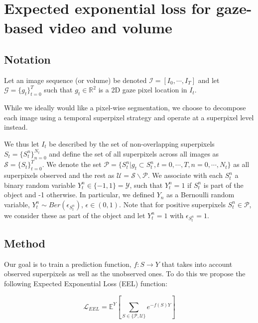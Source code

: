 
\chapter{Expected exponential loss for gaze-based video and volume}
\label{eel} %

\section{Notation}
Let an image sequence (or volume) be denoted $\mathcal{I} = [I_{0}, \cdots , I_{T}]$ and let $\mathcal{G} = \{g_{t} \}^{T}_{t=0}$ such that $g_t\in \mathbb{R}^{2}$ is a 2D gaze pixel location in $I_{t}$.

While we ideally would like
a pixel-wise segmentation, we choose to decompose each image using a temporal superpixel
strategy \cite{chang13} and operate at a superpixel level instead.

We thus let $I_t$ be described by the set of non-overlapping superpixels
$S_{t} = \{S^{n}_t\}^{N_t}_{n=0}$ and define the set of all superpixels across all
images as $\mathcal{S} = \{S_t \}^{T}_{t=0}$.
We denote the set $\mathcal{P} = \{S^{n}_t | g_{t} \subset S^{n}_t, t = 0, \cdots, T, n = 0, \cdots, N_t \}$ as all
superpixels observed and the rest as $\mathcal{U} = \mathcal{S} \backslash \mathcal{P}$.
We associate with each $S^{n}_t$ a binary random variable $Y^{n}_{t} \in \{-1, 1\} = \mathcal{Y}$,
such that $Y^{n}_t = 1$ if $S^{n}_t$ is part of the object and -1 otherwise.
In particular, we defined $Y_n$ as a Bernoulli random variable, $Y^{n}_t \sim Ber(\epsilon_{S^{n}_{t}})$, $\epsilon \in (0,1)$.
Note that for positive superpixels $S^{n}_t \in \mathcal{P}$, we consider these as part of the object and let $Y^{n}_t = 1$ with $\epsilon_{S^{n}_{t}}=1$.

\section{Method}
Our goal is to train a prediction function, $f : S \rightarrow Y$
that takes into account observed superpixels as well as the unobserved ones.
To do this we propose the following Expected Exponential Loss (EEL) function:

\begin{equation}
  \mathcal{L}_{EEL} = \mathbb{E}^{Y} \left[ \sum_{S \in \{ \mathcal{P}, \mathcal{U}\}} e^{-f(S)Y}\right]
\end{equation}

